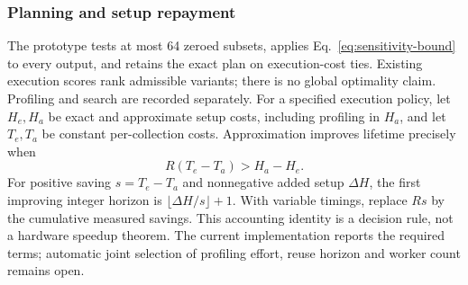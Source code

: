 \subsubsection{Planning and setup repayment}
The prototype tests at most 64 zeroed subsets, applies Eq.~\eqref{eq:sensitivity-bound} to every output, and retains the exact plan on execution-cost ties. Existing execution scores rank admissible variants; there is no global optimality claim. Profiling and search are recorded separately. For a specified execution policy, let $H_e,H_a$ be exact and approximate setup costs, including profiling in $H_a$, and let $T_e,T_a$ be constant per-collection costs. Approximation improves lifetime precisely when
\begin{equation}
 R(T_e-T_a)>H_a-H_e.
 \label{eq:reuse-condition}
\end{equation}
For positive saving $s=T_e-T_a$ and nonnegative added setup $\Delta H$, the first improving integer horizon is $\lfloor\Delta H/s\rfloor+1$. With variable timings, replace $Rs$ by the cumulative measured savings. This accounting identity is a decision rule, not a hardware speedup theorem. The current implementation reports the required terms; automatic joint selection of profiling effort, reuse horizon and worker count remains open.
